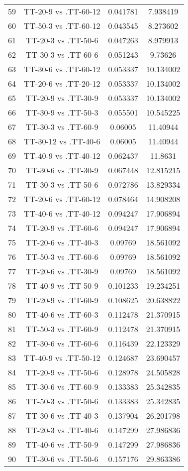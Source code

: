 \documentclass[a4paper,10pt]{article}
\begin{document}
\begin{landscape}
\begin{table}[!htp]
\begin{tabular}{cccc}
59&TT-20-9 vs .TT-60-12&0.041781&7.938419\\
60&TT-50-3 vs .TT-60-12&0.043545&8.273602\\
61&TT-20-3 vs .TT-50-6&0.047263&8.979913\\
62&TT-30-3 vs .TT-60-6&0.051243&9.73626\\
63&TT-30-6 vs .TT-60-12&0.053337&10.134002\\
64&TT-20-6 vs .TT-20-12&0.053337&10.134002\\
65&TT-20-9 vs .TT-30-9&0.053337&10.134002\\
66&TT-30-9 vs .TT-50-3&0.055501&10.545225\\
67&TT-30-3 vs .TT-60-9&0.06005&11.40944\\
68&TT-30-12 vs .TT-40-6&0.06005&11.40944\\
69&TT-40-9 vs .TT-40-12&0.062437&11.8631\\
70&TT-30-6 vs .TT-30-9&0.067448&12.815215\\
71&TT-30-3 vs .TT-50-6&0.072786&13.829334\\
72&TT-20-6 vs .TT-60-12&0.078464&14.908208\\
73&TT-40-6 vs .TT-40-12&0.094247&17.906894\\
74&TT-20-9 vs .TT-60-6&0.094247&17.906894\\
75&TT-20-6 vs .TT-40-3&0.09769&18.561092\\
76&TT-50-3 vs .TT-60-6&0.09769&18.561092\\
77&TT-20-6 vs .TT-30-9&0.09769&18.561092\\
78&TT-40-9 vs .TT-50-9&0.101233&19.234251\\
79&TT-20-9 vs .TT-60-9&0.108625&20.638822\\
80&TT-40-6 vs .TT-60-3&0.112478&21.370915\\
81&TT-50-3 vs .TT-60-9&0.112478&21.370915\\
82&TT-30-6 vs .TT-60-6&0.116439&22.123329\\
83&TT-40-9 vs .TT-50-12&0.124687&23.690457\\
84&TT-20-9 vs .TT-50-6&0.128978&24.505828\\
85&TT-30-6 vs .TT-60-9&0.133383&25.342835\\
86&TT-50-3 vs .TT-50-6&0.133383&25.342835\\
87&TT-30-6 vs .TT-40-3&0.137904&26.201798\\
88&TT-20-3 vs .TT-40-6&0.147299&27.986836\\
89&TT-40-6 vs .TT-50-9&0.147299&27.986836\\
90&TT-30-6 vs .TT-50-6&0.157176&29.863386\\

\end{tabular}
\end{table}
\end{landscape}
\end{document}
